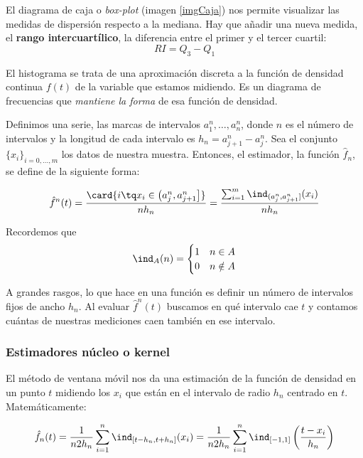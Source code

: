 \documentclass{apuntes}
\begin{document}
\begin{defn}
El diagrama de caja o \textit{box-plot}  (imagen \ref{imgCaja}) nos permite visualizar las medidas de dispersión respecto a la mediana. Hay que añadir una nueva medida, el \textbf{rango intercuartílico}, la diferencia entre el primer y el tercer cuartil: \[RI = Q_3 - Q_1 \]

\end{defn}

\begin{defn}[Histograma]
El histograma se trata de una aproximación discreta a la función de densidad continua $f(t)$ de la variable que estamos midiendo. Es un diagrama de frecuencias que \textit{mantiene la forma} de esa función de densidad. 

Definimos una serie, las marcas de intervalos $a^n_1, \dotsc, a^n_n$, donde $n$ es el número de intervalos y la longitud de cada intervalo  es $h_n = a^n_{j+1} - a^n_j$. Sea el conjunto $\{x_i\}_{i=0,\dotsc,m}$ los datos de nuestra muestra. Entonces, el estimador, la función $\hat{f}_n$, se define de la siguiente forma:

\[ \hat{f}^n(t) = \frac{\card{i \tq x_i \in \left( a_j^n, a_{j+1}^n \right]}}{n h_n} = \frac{\sum_{i=1}^m \ind_{(a_j^n, a_{j+1}^n]} (x_i)}{n h_n} \]

Recordemos que \[ \ind_A (n) = \begin{cases} 1 & n \in A \\ 0 & n \notin A\end{cases}\]

A grandes rasgos, lo que hace en una función es definir un número de intervalos fijos de ancho $h_n$. Al evaluar $\hat{f}^n(t)$ buscamos en qué intervalo cae $t$ y contamos cuántas de nuestras mediciones caen también en ese intervalo.


\end{defn}

\subsubsection{Estimadores núcleo o kernel}

\begin{defn}
El método de ventana móvil nos da una estimación de la función de densidad en un punto $t$ midiendo los $x_i$ que están en el intervalo de radio $h_n$ centrado en $t$. Matemáticamente:

\[ \hat{f}_n(t) = \frac{1}{n2h_n}\sum_{i=1}^n \ind_{[t-h_n, t+h_n]}(x_i) = \frac{1}{n2h_n}\sum_{i=1}^n \ind_{[-1,1]}\left(\frac{t-x_i}{h_n}\right) \]
\end{defn}
\end{document}
